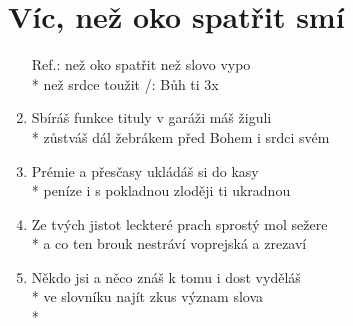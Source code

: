 \section{Víc, než oko spatřit smí}
\begin{enumerate}
\item[Ref.:]  než oko spatřit   než slovo vypo \\*
 než srdce toužit     /: Bůh ti                 3x 
\item Sbíráš funkce tituly v garáži máš žiguli \\*
zůstváš dál žebrákem před Bohem i srdci svém 
\item Prémie a přesčasy ukládáš si do kasy \\*
peníze i s pokladnou zloději ti ukradnou 
\item Ze tvých jistot leckteré prach sprostý mol sežere \\*
a co ten brouk nestráví voprejská a zrezaví 
\item Někdo jsi a něco znáš k tomu i dost vyděláš \\*
ve slovníku najít zkus význam slova  \\*
\end{enumerate}
